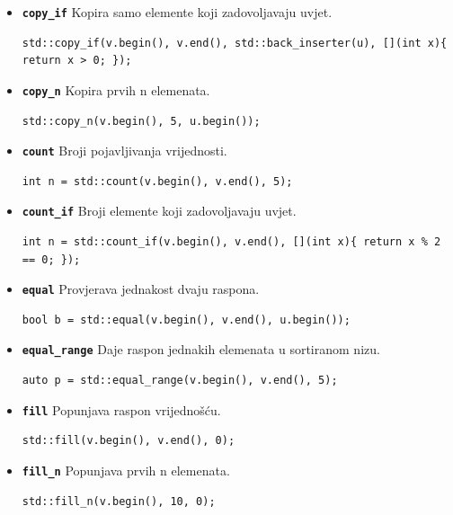 \begin{itemize}
\item \textbf{\texttt{copy\_if}}\newline
Kopira samo elemente koji zadovoljavaju uvjet.
\begin{verbatim}
std::copy_if(v.begin(), v.end(), std::back_inserter(u), [](int x){ return x > 0; });
\end{verbatim}

\item \textbf{\texttt{copy\_n}}\newline
Kopira prvih n elemenata.
\begin{verbatim}
std::copy_n(v.begin(), 5, u.begin());
\end{verbatim}

\item \textbf{\texttt{count}}\newline
Broji pojavljivanja vrijednosti.
\begin{verbatim}
int n = std::count(v.begin(), v.end(), 5);
\end{verbatim}

\item \textbf{\texttt{count\_if}}\newline
Broji elemente koji zadovoljavaju uvjet.
\begin{verbatim}
int n = std::count_if(v.begin(), v.end(), [](int x){ return x % 2 == 0; });
\end{verbatim}

\item \textbf{\texttt{equal}}\newline
Provjerava jednakost dvaju raspona.
\begin{verbatim}
bool b = std::equal(v.begin(), v.end(), u.begin());
\end{verbatim}

\item \textbf{\texttt{equal\_range}}\newline
Daje raspon jednakih elemenata u sortiranom nizu.
\begin{verbatim}
auto p = std::equal_range(v.begin(), v.end(), 5);
\end{verbatim}

\item \textbf{\texttt{fill}}\newline
Popunjava raspon vrijednošću.
\begin{verbatim}
std::fill(v.begin(), v.end(), 0);
\end{verbatim}

\item \textbf{\texttt{fill\_n}}\newline
Popunjava prvih n elemenata.
\begin{verbatim}
std::fill_n(v.begin(), 10, 0);
\end{verbatim}


\end{itemize}
